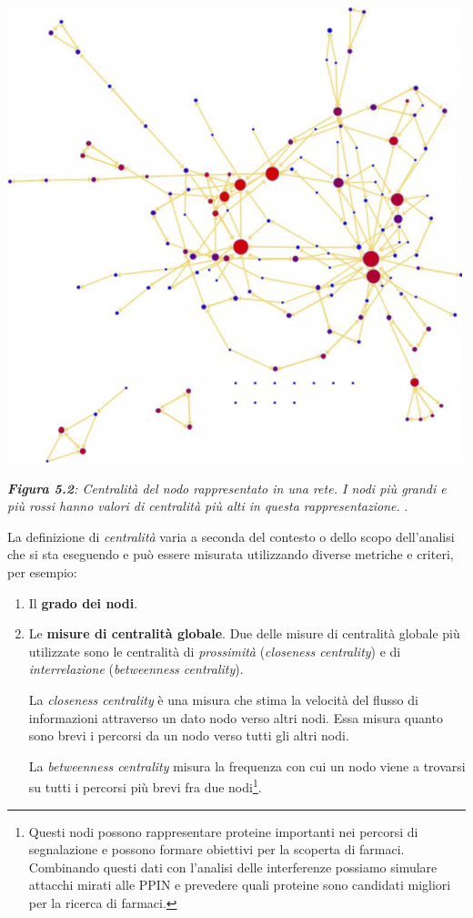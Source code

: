 \documentclass[11pt]{article}
\begin{document}
\begin{center}
\includegraphics[scale=0.4]{ca}

\begin{small}\textit{\textbf{Figura 5.2}: Centralità del nodo rappresentato in una rete. I nodi più grandi e più rossi hanno valori di centralità più alti in questa rappresentazione. }.\end{small}
\end{center}

La definizione di \textit{centralità} varia a seconda del contesto o dello scopo dell'analisi che si sta eseguendo e può essere misurata utilizzando diverse metriche e criteri, per esempio:

\begin{enumerate}
\setlength{\itemsep}{1pt}
  \setlength{\parskip}{0pt}
  \setlength{\parsep}{0pt}
\item Il \textbf{grado dei nodi}.
\item Le \textbf{misure di centralità globale}. Due delle misure di centralità globale più utilizzate sono le centralità di \textit{prossimità} (\textit{closeness centrality}) e di \textit{interrelazione} (\textit{betweenness centrality}).

La \textit{closeness centrality} è una misura che stima la velocità del flusso di informazioni attraverso un dato nodo verso altri nodi. Essa misura quanto sono brevi i percorsi da un nodo verso tutti gli altri nodi.

La \textit{betweenness centrality} misura la frequenza con cui un nodo viene a trovarsi su tutti i percorsi più brevi fra due nodi\footnote{Questi nodi possono rappresentare proteine importanti nei percorsi di segnalazione e possono formare obiettivi per la scoperta di farmaci. Combinando questi dati con l'analisi delle interferenze possiamo simulare attacchi mirati alle PPIN e prevedere quali proteine sono candidati migliori per la ricerca di farmaci.}.
\end{enumerate}
\end{document}
